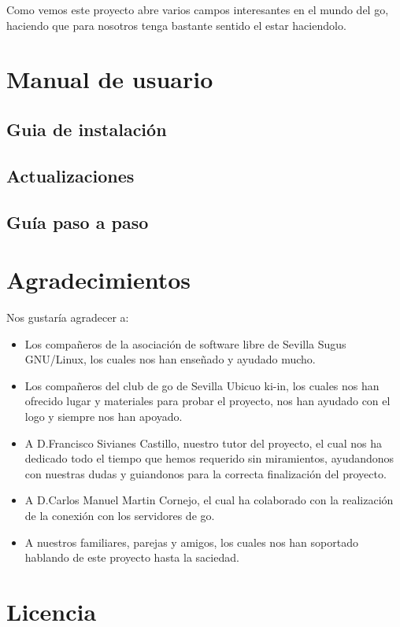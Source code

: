 \documentclass[12pt,a4paper]{report}
\begin{document}
Como vemos este proyecto abre varios campos interesantes en el mundo del go, haciendo que para nosotros tenga bastante sentido el estar haciendolo. 

\chapter{Manual de usuario}
\section{Guia de instalación}
\section{Actualizaciones}
\section{Guía paso a paso}



\chapter{Agradecimientos}
Nos gustaría agradecer a:
\begin{itemize}
\item Los compañeros de la asociación de software libre de Sevilla Sugus GNU/Linux, los cuales nos han enseñado y ayudado mucho.
\item Los compañeros del club de go de Sevilla Ubicuo ki-in, los cuales nos han ofrecido lugar y materiales para probar el proyecto, nos han ayudado con el logo y siempre nos han apoyado. 
\item A D.Francisco Sivianes Castillo, nuestro tutor del proyecto, el cual nos ha dedicado todo el tiempo que hemos requerido sin miramientos, ayudandonos con nuestras dudas y guiandonos para la correcta finalización del proyecto.
\item A D.Carlos Manuel Martin Cornejo, el cual ha colaborado con la realización de la conexión con los servidores de go.
\item A nuestros familiares, parejas y amigos, los cuales nos han soportado hablando de este proyecto hasta la saciedad.
 
\end{itemize}


\chapter{Licencia}
\end{document}
